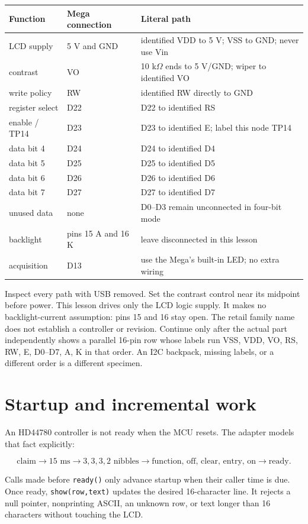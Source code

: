 \documentclass[11pt]{article}
\begin{document}
\begin{tabularx}{\linewidth}{@{}l l X@{}}
\toprule
Function & Mega connection & Literal path\\
\midrule
LCD supply & 5 V and GND & identified VDD to 5 V; VSS to GND; never use Vin\\
contrast & VO & 10 k\(\Omega\) ends to 5 V/GND; wiper to identified VO\\
write policy & RW & identified RW directly to GND\\
register select & D22 & D22 to identified RS\\
enable / TP14 & D23 & D23 to identified E; label this node TP14\\
data bit 4 & D24 & D24 to identified D4\\
data bit 5 & D25 & D25 to identified D5\\
data bit 6 & D26 & D26 to identified D6\\
data bit 7 & D27 & D27 to identified D7\\
unused data & none & D0--D3 remain unconnected in four-bit mode\\
backlight & pins 15 A and 16 K & leave disconnected in this lesson\\
acquisition & D13 & use the Mega's built-in LED; no extra wiring\\
\bottomrule
\end{tabularx}

Inspect every path with USB removed. Set the contrast control near its midpoint
before power. This lesson drives only the LCD logic supply. It makes no
backlight-current assumption: pins 15 and 16 stay open. The retail family name
does not establish a controller or revision. Continue only after the actual
part independently shows a parallel 16-pin row whose labels run VSS, VDD, VO,
RS, RW, E, D0--D7, A, K in that order. An I2C backpack, missing labels, or a
different order is a different specimen.

\section{Startup and incremental work}

An HD44780 controller is not ready when the MCU resets. The adapter models that
fact explicitly:

\[
\text{claim}\rightarrow15\text{ ms}\rightarrow
3,3,3,2\text{ nibbles}\rightarrow
\text{function, off, clear, entry, on}\rightarrow\text{ready}.
\]

Calls made before \texttt{ready()} only advance startup when their caller time
is due. Once ready, \texttt{show(row,text)} updates the desired 16-character
line. It rejects a null pointer, nonprinting ASCII, an unknown row, or text
longer than 16 characters without touching the LCD.
\end{document}
